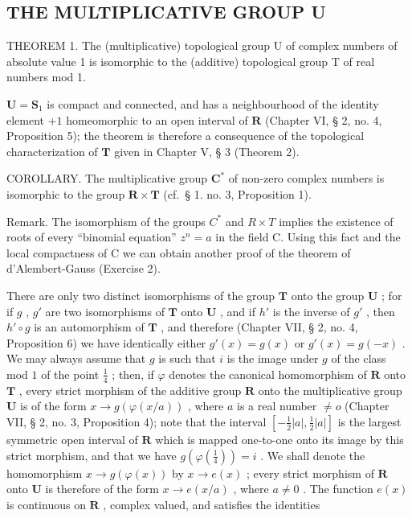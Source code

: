 \subsection{THE MULTIPLICATIVE GROUP U}

THEOREM 1. The (multiplicative) topological group U of complex numbers of absolute value 1 is isomorphic to the (additive) topological group T of real numbers mod 1.

\(\mathbf{U} = \mathbf{S}_{1}\) is compact and connected, and has a neighbourhood of the identity element \(+1\) homeomorphic to an open interval of \(\mathbf{R}\) (Chapter VI, § 2, no. 4, Proposition 5); the theorem is therefore a consequence of the topological characterization of \(\mathbf{T}\) given in Chapter V, § 3 (Theorem 2).

COROLLARY. The multiplicative group \(\mathbf{C}^*\) of non-zero complex numbers is isomorphic to the group \(\mathbf{R} \times \mathbf{T}\) (cf.~§ 1. no. 3, Proposition 1).

Remark. The isomorphism of the groups \(C^{*}\) and \(R \times T\) implies the existence of roots of every ``binomial equation'' \(z^{n} = a\) in the field C. Using this fact and the local compactness of C we can obtain another proof of the theorem of d'Alembert-Gauss (Exercise 2).

There are only two distinct isomorphisms of the group \(\mathbf{T}\) onto the group \(\mathbf{U}\) ; for if \(g\) , \(g'\) are two isomorphisms of \(\mathbf{T}\) onto \(\mathbf{U}\) , and if \(h'\) is the inverse of \(g'\) , then \(h' \circ g\) is an automorphism of \(\mathbf{T}\) , and therefore (Chapter VII, § 2, no. 4, Proposition 6) we have identically either \(g'(x) = g(x)\) or \(g'(x) = g(-x)\) . We may always assume that \(g\) is such that \(i\) is the image under \(g\) of the class mod \(1\) of the point \(\frac{1}{4}\) ; then, if \(\varphi\) denotes the canonical homomorphism of \(\mathbf{R}\) onto \(\mathbf{T}\) , every strict morphism of the additive group \(\mathbf{R}\) onto the multiplicative group \(\mathbf{U}\) is of the form \(x \to g(\varphi(x/a))\) , where \(a\) is a real number \(\neq o\) (Chapter VII, § 2, no. 3, Proposition 4); note that the interval \([- \frac{1}{2} |a|, \frac{1}{2} |a|]\) is the largest symmetric open interval of \(\mathbf{R}\) which is mapped one-to-one onto its image by this strict morphism, and that we have \(g(\varphi(\frac{1}{4})) = i\) . We shall denote the homomorphism \(x \to g(\varphi(x))\) by \(x \to e(x)\) ; every strict morphism of \(\mathbf{R}\) onto \(\mathbf{U}\) is therefore of the form \(x \to e(x/a)\) , where \(a \neq 0\) . The function \(e(x)\) is continuous on \(\mathbf{R}\) , complex valued, and satisfies the identities

